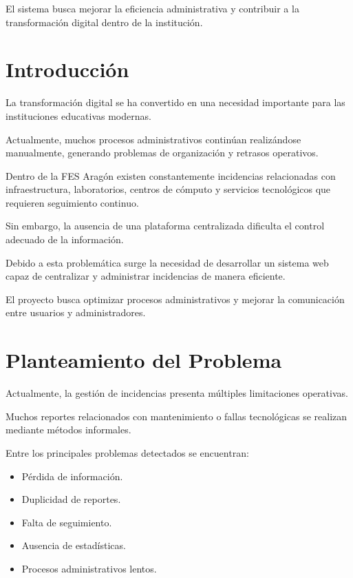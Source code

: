 \documentclass[12pt,letterpaper,oneside]{extreport}
\begin{document}
El sistema busca mejorar la eficiencia administrativa y contribuir a la transformación digital dentro de la institución.

\chapter{Introducción}

La transformación digital se ha convertido en una necesidad importante para las instituciones educativas modernas.

Actualmente, muchos procesos administrativos continúan realizándose manualmente, generando problemas de organización y retrasos operativos.

Dentro de la FES Aragón existen constantemente incidencias relacionadas con infraestructura, laboratorios, centros de cómputo y servicios tecnológicos que requieren seguimiento continuo.

Sin embargo, la ausencia de una plataforma centralizada dificulta el control adecuado de la información.

Debido a esta problemática surge la necesidad de desarrollar un sistema web capaz de centralizar y administrar incidencias de manera eficiente.

El proyecto busca optimizar procesos administrativos y mejorar la comunicación entre usuarios y administradores.

\chapter{Planteamiento del Problema}

Actualmente, la gestión de incidencias presenta múltiples limitaciones operativas.

Muchos reportes relacionados con mantenimiento o fallas tecnológicas se realizan mediante métodos informales.

Entre los principales problemas detectados se encuentran:

\begin{itemize}
    \item Pérdida de información.
    
    \item Duplicidad de reportes.
    
    \item Falta de seguimiento.
    
    \item Ausencia de estadísticas.
    
    \item Procesos administrativos lentos.
\end{itemize}
\end{document}
